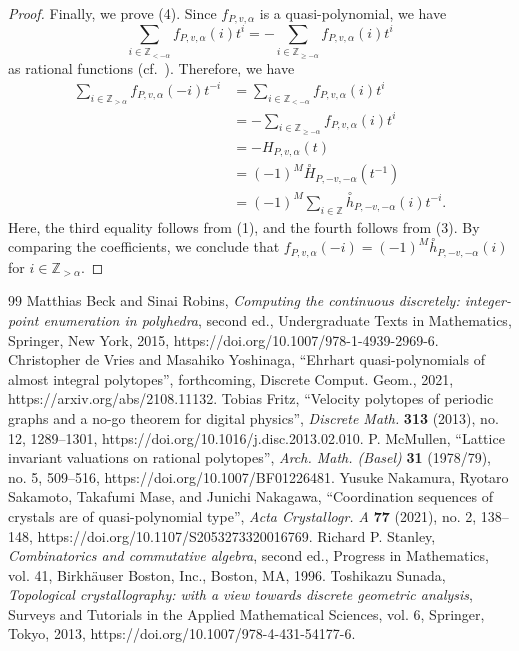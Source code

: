 \documentclass[10pt,a4paper]{amsart}
\theoremstyle{plain}
\theoremstyle{definition}
\theoremstyle{remark}
\begin{document}
\begin{proof}
Finally, we prove (4). 
Since $f_{P,v,\alpha}$ is a quasi-polynomial, we have
\[
\sum _{i \in \mathbb{Z}_{< - \alpha}} {f_{P,v,\alpha}(i)} t^{i} 
= - \sum _{i \in \mathbb{Z}_{\ge - \alpha}} {f_{P,v,\alpha}(i)} t^i
\]
as rational functions (cf.~\cite[Exercise 4.7]{BR}). 
Therefore, we have 
\begin{align*}
\sum _{i \in \mathbb{Z}_{> \alpha}} {f_{P,v,\alpha}(- i)} t^{- i}
&= \sum _{i \in \mathbb{Z}_{< - \alpha}} {f_{P,v,\alpha}(i)} t^{i} \\ 
&=- \sum _{i \in \mathbb{Z}_{\ge - \alpha}} {f_{P,v,\alpha}(i)} t^i \\
&=- H_{P,v,\alpha}(t) \\
&= (-1)^{M} \overset{\circ}{H}_{P, -v, - \alpha}(t^{-1}) \\
&= (-1)^{M} \sum _{i \in \mathbb{Z}} \overset{\circ}{h}_{P, -v, - \alpha}(i) t^{-i}. 
\end{align*}
Here, the third equality follows from (1), and the fourth follows from (3). 
By comparing the coefficients, we conclude that $f_{P,v,\alpha}(- i) = (-1)^M \overset{\circ}{h}_{P, -v, - \alpha}(i)$ for $i \in \mathbb{Z}_{> \alpha}$. 
\end{proof}

\begin{thebibliography}{99}
 Matthias Beck and Sinai Robins, \emph{Computing the continuous discretely: integer-point enumeration in polyhedra}, second ed., Undergraduate Texts in Mathematics, Springer, New York, 2015, https://doi.org/10.1007/978-1-4939-2969-6.
 Christopher de Vries and Masahiko Yoshinaga, ``Ehrhart quasi-polynomials of almost integral polytopes'', forthcoming, Discrete Comput. Geom., 2021, https://arxiv.org/abs/2108.11132.
 Tobias Fritz, ``Velocity polytopes of periodic graphs and a no-go theorem for digital physics'', \emph{Discrete Math.} \textbf{313} (2013), no. 12, 1289--1301, https://doi.org/10.1016/j.disc.2013.02.010.
 P. McMullen, ``Lattice invariant valuations on rational polytopes'', \emph{Arch. Math. (Basel)} \textbf{31} (1978/79), no. 5, 509--516, https://doi.org/10.1007/BF01226481.
 Yusuke Nakamura, Ryotaro Sakamoto, Takafumi Mase, and Junichi Nakagawa, ``Coordination sequences of crystals are of quasi-polynomial type'', \emph{Acta Crystallogr. A} \textbf{77} (2021), no. 2, 138--148, https://doi.org/10.1107/S2053273320016769.
 Richard P. Stanley, \emph{Combinatorics and commutative algebra}, second ed., Progress in Mathematics, vol. 41, Birkh\"auser Boston, Inc., Boston, MA, 1996.
 Toshikazu Sunada, \emph{Topological crystallography: with a view towards discrete geometric analysis}, Surveys and Tutorials in the Applied Mathematical Sciences, vol. 6, Springer, Tokyo, 2013, https://doi.org/10.1007/978-4-431-54177-6.
\end{thebibliography}
\end{document}
